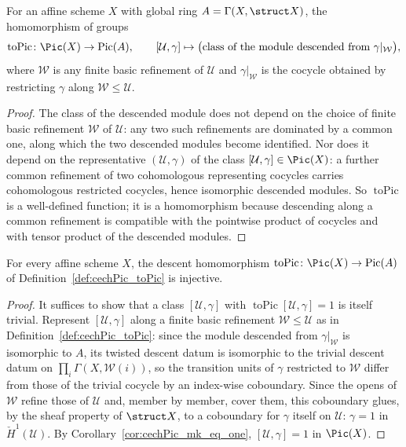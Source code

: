 \begin{definition}
  \label{def:cechPic_toPic}
  \leanok
  For an affine scheme \(X\) with global ring \(A = \Gamma(X,\struct X)\), the homomorphism of
  groups
  \[
    \operatorname{toPic} \colon \Pic(X) \to \operatorname{Pic}(A), \qquad [\mathcal U,\gamma]
    \mapsto \bigl(\text{class of the module descended from } \gamma|_{\mathcal W}\bigr),
  \]
  where \(\mathcal W\) is any finite basic refinement of \(\mathcal U\) and
  \(\gamma|_{\mathcal W}\) is the cocycle obtained by restricting \(\gamma\) along
  \(\mathcal W \le \mathcal U\).
\end{definition}
\begin{proof}
  \leanok
  The class of the descended module does not depend on the choice of finite basic refinement
  \(\mathcal W\) of \(\mathcal U\): any two such refinements are dominated by a common one, along
  which the two descended modules become identified. Nor does it depend on the representative
  \((\mathcal U,\gamma)\) of the class \([\mathcal U,\gamma] \in \Pic(X)\): a further common
  refinement of two cohomologous representing cocycles carries cohomologous restricted
  cocycles, hence isomorphic descended modules. So \(\operatorname{toPic}\) is a well-defined
  function; it is a homomorphism because descending along a common refinement is compatible
  with the pointwise product of cocycles and with tensor product of the descended modules.
\end{proof}

\begin{theorem}
  \label{thm:cechPic_toPic_injective}
  \leanok
  For every affine scheme \(X\), the descent homomorphism \(\operatorname{toPic} \colon
  \Pic(X) \to \operatorname{Pic}(A)\) of Definition~\ref{def:cechPic_toPic} is injective.
\end{theorem}
\begin{proof}
  \leanok
  It suffices to show that a class \([\mathcal U,\gamma]\) with
  \(\operatorname{toPic}[\mathcal U,\gamma] = 1\) is itself trivial. Represent
  \([\mathcal U,\gamma]\) along a finite basic refinement \(\mathcal W \le \mathcal U\) as in
  Definition~\ref{def:cechPic_toPic}: since the module descended from \(\gamma|_{\mathcal W}\)
  is isomorphic to \(A\), its twisted descent datum is isomorphic to the trivial descent datum
  on \(\prod_i \Gamma(X,\mathcal W(i))\), so the transition units of \(\gamma\) restricted to
  \(\mathcal W\) differ from those of the trivial cocycle by an index-wise coboundary. Since the
  opens of \(\mathcal W\) refine those of \(\mathcal U\) and, member by member, cover them, this
  coboundary glues, by the sheaf property of \(\struct X\), to a coboundary for \(\gamma\)
  itself on \(\mathcal U\): \(\gamma = 1\) in \(\check H^1(\mathcal U)\). By
  Corollary~\ref{cor:cechPic_mk_eq_one}, \([\mathcal U,\gamma] = 1\) in \(\Pic(X)\).
\end{proof}

